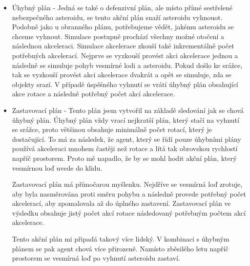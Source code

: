\begin{itemize}
    \item Úhybný plán - Jedná se také o defenzivní plán, ale místo přímé sestřelené nebezpečného asteroidu, se tento akční plán snaží asteroidu vyhnouot.
    Podobně jako u obranného plánu, potřebujeme vědět, jakému asteroidu se chceme vyhnout. Simulace postupně prochází všechny možné otočení a následnou akceleraci.
    Simulace akcelerace zkouší také inkrementálně počet potřebných akcelerací. Nejprve se vyzkouší provést akci akcelerace jednou a následně se simuluje pohyb vesmírné lodi a asteroidu.
    Pokud došlo ke srážce, tak se vyzkouší provést akci akcelerace dvakrát a opět se simuluje, zda se objekty srazí. 
    V případě úspěšného vyhnutí se vrátí úhybný plán obsahující akce rotace a následně potřebný počet akcí akcelerace.
    
    \item Zastavovací plán - Tento plán jsem vytvořil na základě sledování jak se chová úhybný plán. Úhybný plán vždy vrací nejkratší plán, který stačí na vyhnutí se srážce, proto většinou obsahuje minimálně počet rotací, který je dostačující.
        To má za následek, že agent, který se řídí pouze úhybními plány používá akceleraci mnohem častěji než rotace a lítá tak obrovskou rychlostí napříč prostorem. Proto mě napadlo, že by se mohl hodit akční plán, který vesmírnou loď uvede do klidu.
        \par
        Zastavovací plán má přímočarou myšlenku. 
        Nejdříve se vesmírná loď zrotuje, aby byla nasměrována proti směru pohybu a následně provede potřebný počet akcelerací, aby zpomalovala až do úplného zastavení. 
        Zastavovací plán ve výsledku obsahuje jistý počet akcí rotace následovaný potřebným počtem akcí akcelerace. 

        \par
        Tento akční plán mi připadá takový více lidský. V kombinaci s úhybným plánem se pak agent chová více přirozeně.
        Namísto zběsilého letu napříč prostorem se vesmírná loď po vyhnutí asteroidu zastaví.            
        
\end{itemize}


